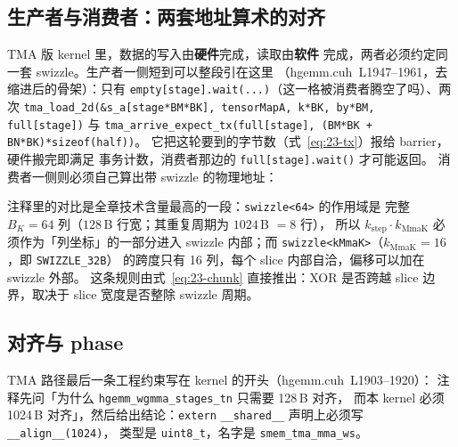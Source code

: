 \subsection{生产者与消费者：两套地址算术的对齐}

TMA 版 kernel 里，数据的写入由\textbf{硬件}完成，读取由\textbf{软件}
完成，两者必须约定同一套 swizzle。生产者一侧短到可以整段引在这里
（hgemm.cuh~L1947--1961，去缩进后的骨架）：只有
\texttt{empty[stage].\allowbreak{}wait\allowbreak{}(.\allowbreak{}.\allowbreak{}.\allowbreak{})}（这一格被消费者腾空了吗）、两次
\texttt{tma\_\allowbreak{}load\_\allowbreak{}2d\allowbreak{}(\&s\_\allowbreak{}a[stage*BM*BK],\allowbreak{} tensor\allowbreak{}Map\allowbreak{}A,\allowbreak{} k*BK,\allowbreak{} by*BM,\allowbreak{} full[stage])}
与 \texttt{tma\_\allowbreak{}arrive\_\allowbreak{}expect\_\allowbreak{}tx\allowbreak{}(full[stage],\allowbreak{} (BM*BK + BN*BK)*sizeof\allowbreak{}(half))}。
它把这轮要到的字节数（式~\eqref{eq:23-tx}）报给 barrier，硬件搬完即满足
事务计数，消费者那边的 \texttt{full[stage].\allowbreak{}wait\allowbreak{}()} 才可能返回。
消费者一侧则必须自己算出带 swizzle 的物理地址：



注释里的对比是全章技术含量最高的一段：\texttt{swizzle<64>} 的作用域是
完整 $B_K=64$ 列（$128$\,B 行宽；其重复周期为 $1024$\,B $=8$ 行），
所以 $k_{\text{step}}\cdot k_{\text{MmaK}}$
必须作为「列坐标」的一部分进入 swizzle 内部；而
\texttt{swizzle\allowbreak{}<k\allowbreak{}Mma\allowbreak{}K>}（$k_{\text{MmaK}}=16$，即 \texttt{SWIZZLE\_32B}）
的跨度只有 16 列，每个 slice 内部自洽，偏移可以加在 swizzle 外部。
这条规则由式~\eqref{eq:23-chunk} 直接推出：XOR 是否跨越
slice 边界，取决于 slice 宽度是否整除 swizzle 周期。

\subsection{对齐与 phase}

TMA 路径最后一条工程约束写在 kernel 的开头（hgemm.cuh~L1903--1920）：
注释先问「为什么 \texttt{hgemm\_\allowbreak{}wgmma\_\allowbreak{}stages\_\allowbreak{}tn} 只需要 128\,B 对齐，
而本 kernel 必须 1024\,B 对齐」，然后给出结论：\texttt{extern}
\texttt{\_\_shared\_\_} 声明上必须写 \texttt{\_\allowbreak{}\_\allowbreak{}align\_\allowbreak{}\_\allowbreak{}(1024)}，
类型是 \texttt{uint8\_t}，名字是 \texttt{smem\_\allowbreak{}tma\_\allowbreak{}mma\_\allowbreak{}ws}。

